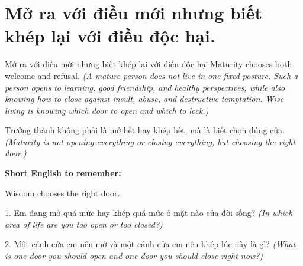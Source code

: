 \section{Mở ra với điều mới nhưng biết khép lại với điều độc hại.}
\begin{truyen}{Mở ra với điều mới nhưng biết khép lại với điều độc hại.}{Maturity chooses both welcome and refusal.}
\textit{(A mature person does not live in one fixed posture. Such a person opens to learning, good friendship, and healthy perspectives, while also knowing how to close against insult, abuse, and destructive temptation. Wise living is knowing which door to open and which to lock.)}
\end{truyen}
\begin{baihoc}
Trưởng thành không phải là mở hết hay khép hết, mà là biết chọn đúng cửa.
\textit{(Maturity is not opening everything or closing everything, but choosing the right door.)}
\end{baihoc}
\begin{ghinhoanh}
\textbf{Short English to remember:}

Wisdom chooses the right door.
\end{ghinhoanh}
\begin{tuhocnhanh}
1. Em đang mở quá mức hay khép quá mức ở mặt nào của đời sống? \textit{(In which area of life are you too open or too closed?)}

2. Một cánh cửa em nên mở và một cánh cửa em nên khép lúc này là gì? \textit{(What is one door you should open and one door you should close right now?)}
\end{tuhocnhanh}
\ngancach
